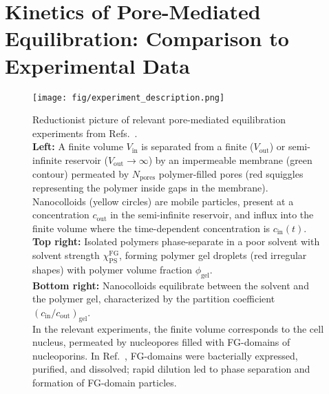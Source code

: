 \documentclass[10pt, a4paper]{article}
\begin{document}



\pagebreak
\section{Kinetics of Pore-Mediated Equilibration: Comparison to Experimental Data}

\begin{multicols}{2}

    \begin{figure}[H]
        \centering
        \texttt{[image: fig/experiment\_description.png]}
        \caption{Reductionist picture of relevant pore-mediated equilibration experiments from Refs.~\cite{Ribbeck2001, Mohr2009, Popken2015, Timney2016, Frey2018}.\\
        \textbf{Left:} A finite volume $V_{\text{in}}$ is separated from a finite ($V_\text{out}$) or semi-infinite reservoir ($V_\text{out}\to \infty$)  by an impermeable membrane (green contour) permeated by $N_{\text{pores}}$ polymer-filled pores (red squiggles representing the polymer inside gaps in the membrane). 
        Nanocolloids (yellow circles) are mobile particles, present at a concentration $c_{\text{out}}$ in the semi-infinite reservoir, and influx into the finite volume where the time-dependent concentration is $c_{\text{in}}(t)$.\\
        \textbf{Top right:} Isolated polymers phase-separate in a poor solvent with solvent strength $\chi_{\text{PS}}^{\text{FG}}$, forming polymer gel droplets (red irregular shapes) with polymer volume fraction $\phi_{\text{gel}}$.\\
        \textbf{Bottom right:} Nanocolloids equilibrate between the solvent and the polymer gel, characterized by the partition coefficient $\left(c_{\text{in}}/c_{\text{out}}\right)_{\text{gel}}$.\\
        In the relevant experiments, the finite volume corresponds to the cell nucleus, permeated by nucleopores filled with FG-domains of nucleoporins. 
        In Ref.~\cite{Frey2018}, FG-domains were bacterially expressed, purified, and dissolved; rapid dilution led to phase separation and formation of FG-domain particles. 
        }
        \label{fig:experiments_overview}
    \end{figure}
    

\end{multicols}
\end{document}

